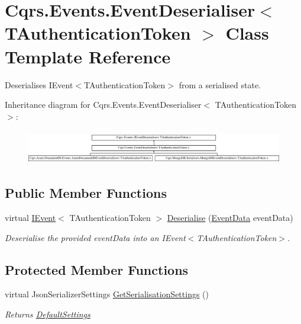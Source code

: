 \hypertarget{classCqrs_1_1Events_1_1EventDeserialiser}{}\section{Cqrs.\+Events.\+Event\+Deserialiser$<$ T\+Authentication\+Token $>$ Class Template Reference}
\label{classCqrs_1_1Events_1_1EventDeserialiser}


Deserialises I\+Event$<$\+T\+Authentication\+Token$>$ from a serialised state.  


Inheritance diagram for Cqrs.\+Events.\+Event\+Deserialiser$<$ T\+Authentication\+Token $>$\+:\begin{figure}[H]
\begin{center}
\leavevmode
\includegraphics[height=1.508079cm]{classCqrs_1_1Events_1_1EventDeserialiser}
\end{center}
\end{figure}
\subsection*{Public Member Functions}
\begin{DoxyCompactItemize}
\item 
virtual \hyperlink{interfaceCqrs_1_1Events_1_1IEvent}{I\+Event}$<$ T\+Authentication\+Token $>$ \hyperlink{classCqrs_1_1Events_1_1EventDeserialiser_a193feac1d58446f0a7447d8ba04179fc_a193feac1d58446f0a7447d8ba04179fc}{Deserialise} (\hyperlink{classCqrs_1_1Events_1_1EventData}{Event\+Data} event\+Data)
\begin{DoxyCompactList}\small\item\em Deserialise the provided {\itshape event\+Data}  into an I\+Event$<$\+T\+Authentication\+Token$>$. \end{DoxyCompactList}\end{DoxyCompactItemize}
\subsection*{Protected Member Functions}
\begin{DoxyCompactItemize}
\item 
virtual Json\+Serializer\+Settings \hyperlink{classCqrs_1_1Events_1_1EventDeserialiser_a3f767a1b793ea47bcafd9c64be47619e_a3f767a1b793ea47bcafd9c64be47619e}{Get\+Serialisation\+Settings} ()
\begin{DoxyCompactList}\small\item\em Returns \hyperlink{classCqrs_1_1Events_1_1EventDeserialiser_a08bd067ca7ce8c28c7a83d444b7e468b_a08bd067ca7ce8c28c7a83d444b7e468b}{Default\+Settings} \end{DoxyCompactList}\end{DoxyCompactItemize}
